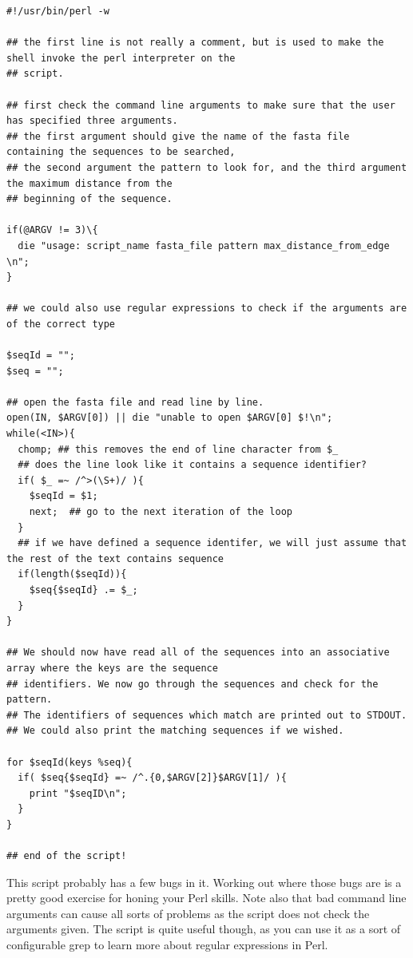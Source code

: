 \documentclass[11pt]{article}
\begin{document}
\begin{verbatim}
#!/usr/bin/perl -w

## the first line is not really a comment, but is used to make the shell invoke the perl interpreter on the
## script.

## first check the command line arguments to make sure that the user has specified three arguments.
## the first argument should give the name of the fasta file containing the sequences to be searched,
## the second argument the pattern to look for, and the third argument the maximum distance from the
## beginning of the sequence.

if(@ARGV != 3)\{
  die "usage: script_name fasta_file pattern max_distance_from_edge \n";
}

## we could also use regular expressions to check if the arguments are of the correct type

$seqId = "";
$seq = "";

## open the fasta file and read line by line.
open(IN, $ARGV[0]) || die "unable to open $ARGV[0] $!\n";
while(<IN>){
  chomp; ## this removes the end of line character from $_
  ## does the line look like it contains a sequence identifier?
  if( $_ =~ /^>(\S+)/ ){
    $seqId = $1;
    next;  ## go to the next iteration of the loop
  }
  ## if we have defined a sequence identifer, we will just assume that the rest of the text contains sequence
  if(length($seqId)){
    $seq{$seqId} .= $_;
  }
}

## We should now have read all of the sequences into an associative array where the keys are the sequence
## identifiers. We now go through the sequences and check for the pattern.
## The identifiers of sequences which match are printed out to STDOUT.
## We could also print the matching sequences if we wished.

for $seqId(keys %seq){
  if( $seq{$seqId} =~ /^.{0,$ARGV[2]}$ARGV[1]/ ){
    print "$seqID\n";
  }
}

## end of the script!
\end{verbatim}

This script probably has a few bugs in it. Working out where those bugs
are is a pretty good exercise for honing your Perl skills. Note also
that bad command line arguments can cause all sorts of problems as the
script does not check the arguments given. The script is quite useful
though, as you can use it as a sort of configurable grep to learn more
about regular expressions in Perl.
\end{document}
